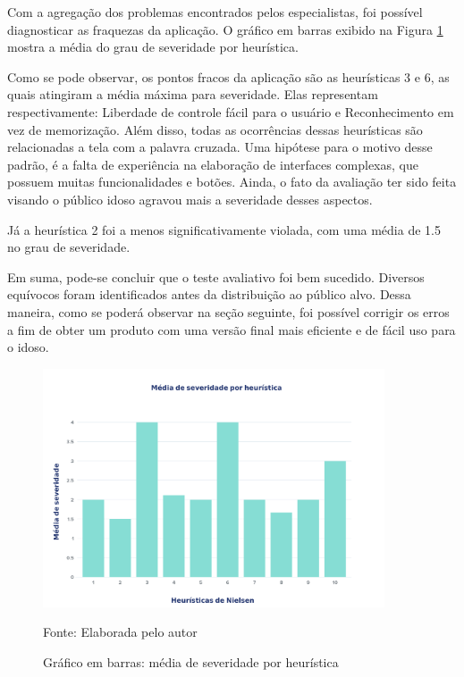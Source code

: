 
Com a agregação dos problemas encontrados pelos especialistas, foi possível diagnosticar as fraquezas da aplicação. O gráfico em barras exibido na Figura \ref{fig:barra-media-heuristica} mostra a média do grau de severidade por heurística.

Como se pode observar, os pontos fracos da aplicação são as heurísticas 3 e 6, as quais atingiram a média máxima para severidade. Elas representam respectivamente: Liberdade de controle fácil para o usuário e Reconhecimento em vez de memorização. Além disso, todas as ocorrências dessas heurísticas são relacionadas a tela com a palavra cruzada. Uma hipótese para o motivo desse padrão, é a falta de experiência na elaboração de interfaces complexas, que possuem muitas funcionalidades e botões. Ainda, o fato da avaliação ter sido feita visando o público idoso agravou mais a severidade desses aspectos. 

Já a heurística 2 foi a menos significativamente violada, com uma média de 1.5 no grau de severidade.

Em suma, pode-se concluir que o teste avaliativo foi bem sucedido. Diversos equívocos foram identificados antes da distribuição ao público alvo. Dessa maneira, como se poderá observar na seção seguinte, foi possível corrigir os erros a fim de obter um produto com uma versão final mais eficiente e de fácil uso para o idoso.

\begin{figure}[H]
\centering
    \caption{Gráfico em barras: média de severidade por heurística}
    \label{fig:barra-media-heuristica}
    \includegraphics[width=0.9\textwidth]{Figuras/severidade-heuristica.png}
    
    Fonte: Elaborada pelo autor
\end{figure}


